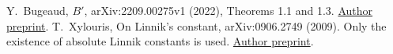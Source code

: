  Y.~Bugeaud, $B'$, arXiv:2209.00275v1 (2022), Theorems 1.1 and 1.3. \href{https://arxiv.org/abs/2209.00275}{Author preprint}.
 T.~Xylouris, On Linnik's constant, arXiv:0906.2749 (2009). Only the existence of absolute Linnik constants is used. \href{https://arxiv.org/abs/0906.2749}{Author preprint}.

